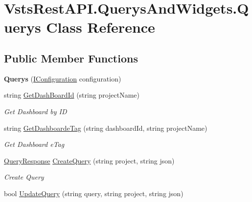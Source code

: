 \hypertarget{class_vsts_rest_a_p_i_1_1_querys_and_widgets_1_1_querys}{}\section{Vsts\+Rest\+A\+P\+I.\+Querys\+And\+Widgets.\+Querys Class Reference}
\label{class_vsts_rest_a_p_i_1_1_querys_and_widgets_1_1_querys}
\subsection*{Public Member Functions}
\begin{DoxyCompactItemize}
\item 
\mbox{\label{class_vsts_rest_a_p_i_1_1_querys_and_widgets_1_1_querys_a63c737d81f8ff1a145f88aee77345cae}} 
{\bfseries Querys} (\mbox{\hyperlink{interface_vsts_rest_a_p_i_1_1_i_configuration}{I\+Configuration}} configuration)
\item 
string \mbox{\hyperlink{class_vsts_rest_a_p_i_1_1_querys_and_widgets_1_1_querys_aef10c7b2cf6ce84aece4df4fc87a9fd6}{Get\+Dash\+Board\+Id}} (string project\+Name)
\begin{DoxyCompactList}\small\item\em Get Dashboard by ID \end{DoxyCompactList}\item 
string \mbox{\hyperlink{class_vsts_rest_a_p_i_1_1_querys_and_widgets_1_1_querys_a367ee3271ff58e50273a73e2bb5da282}{Get\+Dashboarde\+Tag}} (string dashboard\+Id, string project\+Name)
\begin{DoxyCompactList}\small\item\em Get Dashboard e\+Tag \end{DoxyCompactList}\item 
\mbox{\hyperlink{class_vsts_rest_a_p_i_1_1_viewmodel_1_1_querys_and_widgets_1_1_query_response}{Query\+Response}} \mbox{\hyperlink{class_vsts_rest_a_p_i_1_1_querys_and_widgets_1_1_querys_aefe4b14dbc3475676cfcc8f3a007546e}{Create\+Query}} (string project, string json)
\begin{DoxyCompactList}\small\item\em Create Query \end{DoxyCompactList}\item 
bool \mbox{\hyperlink{class_vsts_rest_a_p_i_1_1_querys_and_widgets_1_1_querys_ad50ab1e6c58ac12bd8d39ee52a514e0d}{Update\+Query}} (string query, string project, string json)

\end{DoxyCompactItemize}
